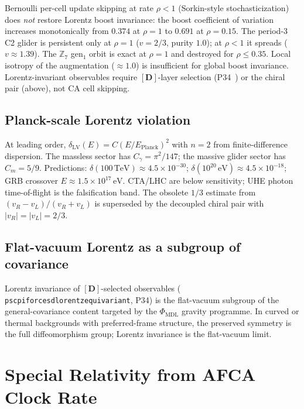 \documentclass[11pt]{article}
\theoremstyle{remark}
\newcommand{\lean}[1]{%
  \penalty-100
  \begingroup\def\_{\textunderscore\allowbreak}\texttt{#1}\endgroup}
\begin{document}
Bernoulli per-cell update skipping at rate $\rho < 1$ (Sorkin-style stochasticization)
does \emph{not} restore Lorentz boost invariance: the boost coefficient of variation
increases monotonically from $0.374$ at $\rho = 1$ to $0.691$ at $\rho = 0.15$.
The period-3 C2 glider is persistent only at $\rho = 1$ ($v = 2/3$, purity $1.0$);
at $\rho < 1$ it spreads ($v \approx 1.39$).
The $\mathbb{Z}_7$ gen$_1$ orbit is exact at $\rho = 1$ and destroyed for
$\rho \leq 0.35$.
Local isotropy of the augmentation ($\approx 1.0$) is insufficient for global
boost invariance.
Lorentz-invariant observables require $[\mathbf{D}]$-layer selection
(P34~\cite{SpivackGTEMobius}) or the chiral pair (above), not CA cell skipping.

\subsection{Planck-scale Lorentz violation}
\label{ssec:planck_lv}

At leading order, $\delta_{\mathrm{LV}}(E) = C (E/E_{\mathrm{Planck}})^2$ with
$n = 2$ from finite-difference dispersion.
The massless sector has $C_\gamma = \pi^2/147$; the massive glider sector has
$C_m = 5/9$.
Predictions: $\delta(100\,\mathrm{TeV}) \approx 4.5\times 10^{-30}$;
$\delta(10^{20}\,\mathrm{eV}) \approx 4.5\times 10^{-18}$;
GRB crossover $E \approx 1.5\times 10^{17}\,\mathrm{eV}$.
CTA/LHC are below sensitivity; UHE photon time-of-flight is the falsification band.
The obsolete $1/3$ estimate from $(v_R - v_L)/(v_R + v_L)$ is superseded by the
decoupled chiral pair with $|v_R| = |v_L| = 2/3$.

\subsection{Flat-vacuum Lorentz as a subgroup of covariance}
\label{ssec:pi_flat}

Lorentz invariance of $[\mathbf{D}]$-selected observables
(\lean{psc\_pi\_forces\_d\_lorentz\_equivariant}, P34) is the flat-vacuum subgroup of
the general-covariance content targeted by the $\Phi_{\mathrm{MDL}}$ gravity programme.
In curved or thermal backgrounds with preferred-frame structure, the preserved symmetry
is the full diffeomorphism group; Lorentz invariance is the flat-vacuum limit.

\section{Special Relativity from AFCA Clock Rate}
\label{sec:sr_afca}
\end{document}
